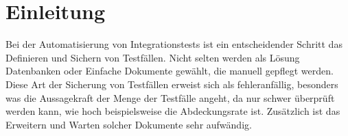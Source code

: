 \chapter{Einleitung}
Bei der Automatisierung von Integrationstests ist ein entscheidender Schritt
das Definieren und Sichern von Testfällen. Nicht selten werden als Lösung
Datenbanken oder Einfache Dokumente gewählt, die manuell gepflegt werden. Diese Art der Sicherung von Testfällen erweist sich als fehleranfällig,
besonders was die Aussagekraft der Menge der Testfälle angeht, da nur
schwer überprüft werden kann, wie hoch beispielsweise die Abdeckungsrate ist. Zusätzlich ist das Erweitern und Warten solcher Dokumente sehr
aufwändig.
